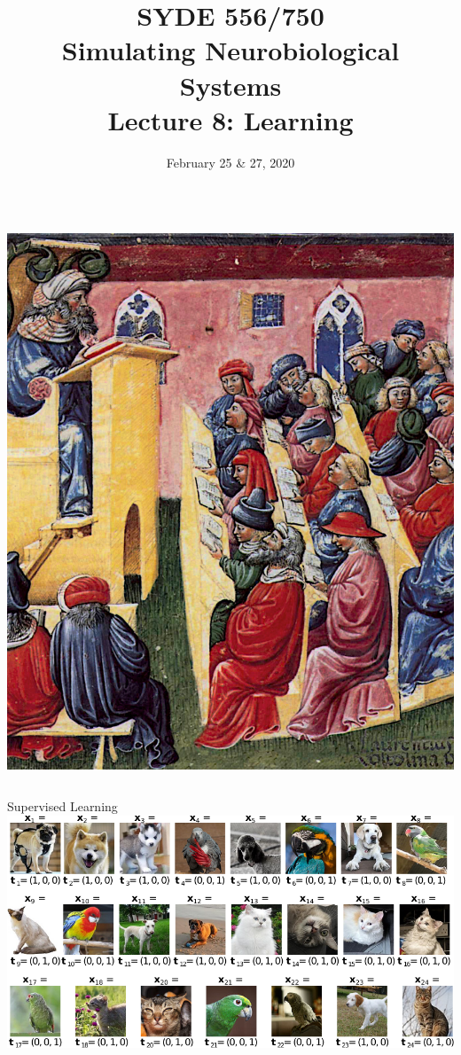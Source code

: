 \documentclass[handout,aspectratio=169]{beamer}
\date{February 25 \& 27, 2020}
\title{SYDE 556/750 \\ Simulating Neurobiological Systems \\ Lecture 8: Learning}
\begin{document}
	
	\begin{frame}{}
		\vspace{0.5cm}
		\begin{columns}[c]
			\MakeTitle
			\includegraphics[width=\textwidth]{media/laurentius_de_voltolina_001_small.jpg}
		\end{columns}
	\end{frame}

	\begin{frame}{Supervised Learning}
		\centering
		\includegraphics[scale=0.95]{media/learning_example_supervised.pdf}
	\end{frame}
\end{document}
